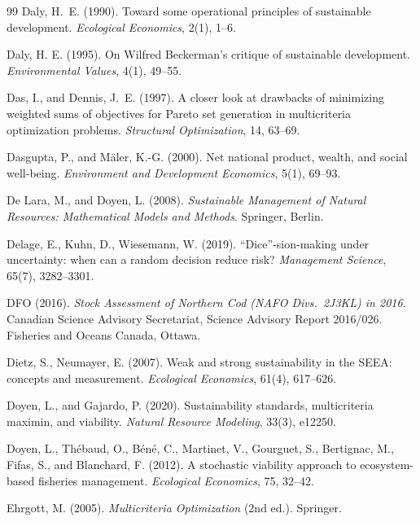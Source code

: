 \begin{thebibliography}{99}
 Daly, H.~E. (1990). Toward some operational principles of sustainable development. \emph{Ecological Economics}, 2(1), 1--6.

 Daly, H. E. (1995). On Wilfred Beckerman's critique of sustainable development. \emph{Environmental Values}, 4(1), 49--55.

 Das, I., and Dennis, J.~E. (1997). A closer look at drawbacks of minimizing weighted sums of objectives for Pareto set generation in multicriteria optimization problems. \emph{Structural Optimization}, 14, 63--69.

 Dasgupta, P., and M\"aler, K.-G. (2000). Net national product, wealth, and social well-being. \emph{Environment and Development Economics}, 5(1), 69--93.

 De Lara, M., and Doyen, L. (2008). \emph{Sustainable Management of Natural Resources: Mathematical Models and Methods}. Springer, Berlin.

 Delage, E., Kuhn, D., Wiesemann, W. (2019). ``Dice''-sion-making under uncertainty: when can a random decision reduce risk? \emph{Management Science}, 65(7), 3282--3301.

 DFO (2016). \emph{Stock Assessment of Northern Cod (NAFO Divs.\ 2J3KL) in 2016}. Canadian Science Advisory Secretariat, Science Advisory Report 2016/026. Fisheries and Oceans Canada, Ottawa.

 Dietz, S., Neumayer, E. (2007). Weak and strong sustainability in the SEEA: concepts and measurement. \emph{Ecological Economics}, 61(4), 617--626.

 Doyen, L., and Gajardo, P. (2020). Sustainability standards, multicriteria maximin, and viability. \emph{Natural Resource Modeling}, 33(3), e12250.

 Doyen, L., Th\'ebaud, O., B\'en\'e, C., Martinet, V., Gourguet, S., Bertignac, M., Fifas, S., and Blanchard, F. (2012). A stochastic viability approach to ecosystem-based fisheries management. \emph{Ecological Economics}, 75, 32--42.

 Ehrgott, M. (2005). \emph{Multicriteria Optimization} (2nd ed.). Springer.


\end{thebibliography}
